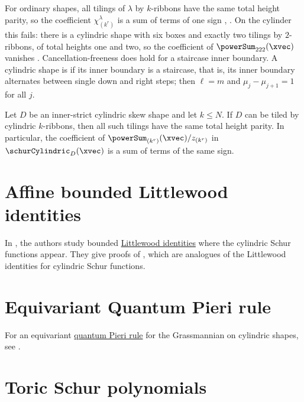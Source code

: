 For ordinary shapes, all tilings of $\lambda$ by $k$-ribbons have the same
total height parity, so the coefficient $\chi^{\lambda}_{(k^r)}$ is a sum of
terms of one sign \cite[Cor.~9]{White1983}, \cite[Thm.~2.7.27]{JamesKerber1984}.
On the cylinder this fails: there is a cylindric shape with six boxes and
exactly two tilings by $2$-ribbons, of total heights one and two, so the
coefficient of $\powerSum_{222}(\xvec)$ vanishes
\cite[Ex.~18]{AlexanderssonOguz2023x}.  Cancellation-freeness does hold for
a staircase inner boundary.
A cylindric shape is \label{cylindricInnerStrict} if its
inner boundary is a staircase, that is, its inner boundary alternates between
single down and right steps; then $\ell=m$ and $\mu_j-\mu_{j+1}=1$ for all $j$.

\begin{theorem}
\label{cylindricMNCancellationFree}
Let $D$ be an inner-strict cylindric skew shape and let $k\leq N$.
If $D$ can be tiled by cylindric $k$-ribbons, then all such tilings have the
same total height parity.  In particular, the coefficient of
$\powerSum_{(k^r)}(\xvec)/z_{(k^r)}$ in $\schurCylindric_D(\xvec)$ is a sum of
terms of the same sign.
\end{theorem}


\section[cylindricAffineLittlewood]{Affine bounded Littlewood identities}

In \cite{HuhKimKrattenthalerOkada2023x}, the authors
study bounded \hyperref[schurSums]{Littlewood identities} where the cylindric
Schur functions appear.
They give proofs of 
\label{affineLittlewoodIdentity}, which are analogues of the Littlewood
identities for cylindric Schur functions.


\section[cylindricEquivariantQuantumPieri]{Equivariant Quantum Pieri rule}

For an equivariant \hyperref[schubertQuantumPieriRule]{quantum Pieri rule}
for the Grassmannian on cylindric shapes, see
\cite{BertigerEhrlichMilicevicTaipale2022x}.



\section[schurToric]{Toric Schur polynomials}

